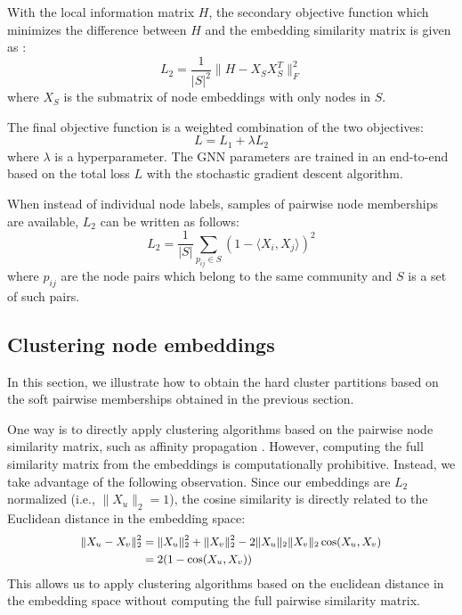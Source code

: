 With the local information matrix $H$, the secondary objective function which minimizes the difference between $H$ and the embedding similarity matrix is given as :
\begin{equation}
    L_2 = \frac{1}{|S|^2}\|H-X_SX_S^T\|_F^2
\end{equation}
where $X_S$ is the submatrix of node embeddings with only nodes in $S$. 

The final objective function is a weighted combination of the two objectives:
\begin{equation}
    L = L_1 + \lambda L_2
\end{equation}
where $\lambda$ is a hyperparameter. The GNN parameters are trained in an end-to-end based on the total loss $L$ with the stochastic gradient descent algorithm. 

When instead of individual node labels, samples of pairwise node memberships are available, $L_2$ can be written as follows:
\begin{equation}
    L_2=\frac{1}{|S|}\sum_{p_{ij} \in S}(1-\langle X_i, X_j \rangle)^2    
\end{equation}
where $p_{ij}$ are the node pairs which belong to the same community and $S$ is a set of such pairs.













\subsection{Clustering node embeddings}
\label{subsec::final_clustering}
In this section, we illustrate how to obtain the hard cluster partitions based on the soft pairwise memberships obtained in the previous section. 

One way is to directly apply clustering algorithms based on the pairwise node similarity matrix, such as affinity propagation  \cite{frey2007clustering}. However, computing the full similarity matrix from the embeddings is computationally prohibitive. Instead, we take advantage of the following observation. Since our embeddings are $L_2$ normalized (i.e., $\|X_u\|_2=1$), the cosine similarity is directly related to the Euclidean distance in the embedding space:
\begin{equation}
    \small
    \begin{aligned}
    \|X_u-X_v\|_2^2&=\|X_u\|_2^2+\|X_v\|_2^2-2\|X_u\|_2\|X_v\|_2\cos(X_u, X_v)\\
    &=2(1-\cos(X_u, X_v))        
    \end{aligned}
\end{equation}
This allows us to apply clustering algorithms based on the euclidean distance in the embedding space without computing the full pairwise similarity matrix. 







